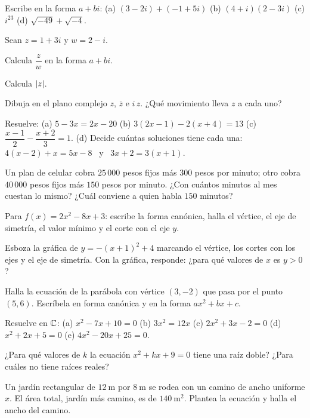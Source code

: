 \documentclass[11pt,a4paper]{article}
\newcommand{\conj}[1]{\overline{#1}}
\begin{document}
\taller
\begin{ejercicios}
\item Escribe en la forma $a+bi$:
  (a) $(3-2i)+(-1+5i)$ \quad (b) $(4+i)(2-3i)$ \quad (c) $i^{23}$ \quad (d) $\sqrt{-49}+\sqrt{-4}$.
\item Sean $z=1+3i$ y $w=2-i$.
  \begin{ejercicios}
  \item Calcula $\dfrac{z}{w}$ en la forma $a+bi$.
  \item Calcula $\left\lvert z\right\rvert$.
  \item Dibuja en el plano complejo $z$, $\conj z$ e $i\,z$. ¿Qué movimiento lleva $z$ a cada uno?
  \end{ejercicios}
\item Resuelve:
  (a) $5-3x=2x-20$ \quad (b) $3(2x-1)-2(x+4)=13$ \quad (c) $\dfrac{x-1}{2}-\dfrac{x+2}{3}=1$.\newline
  (d) Decide cuántas soluciones tiene cada una: $4(x-2)+x=5x-8$ \ y \ $3x+2=3(x+1)$.
\item Un plan de celular cobra $25\,000$ pesos fijos más $300$ pesos por minuto; otro cobra $40\,000$ pesos fijos más
  $150$ pesos por minuto. ¿Con cuántos minutos al mes cuestan lo mismo? ¿Cuál conviene a quien habla $150$ minutos?
\item Para $f(x)=2x^2-8x+3$: escribe la forma canónica, halla el vértice, el eje de simetría, el valor mínimo y el
  corte con el eje $y$.
\item Esboza la gráfica de $y=-(x+1)^2+4$ marcando el vértice, los cortes con los ejes y el eje de simetría. Con la
  gráfica, responde: ¿para qué valores de $x$ es $y>0$?
\item Halla la ecuación de la parábola con vértice $(3,-2)$ que pasa por el punto $(5,6)$. Escríbela en forma canónica
  y en la forma $ax^2+bx+c$.
\item Resuelve en $\mathbb{C}$:
  (a) $x^2-7x+10=0$ \quad (b) $3x^2=12x$ \quad (c) $2x^2+3x-2=0$ \quad (d) $x^2+2x+5=0$ \quad (e) $4x^2-20x+25=0$.
\item ¿Para qué valores de $k$ la ecuación $x^2+kx+9=0$ tiene una raíz doble? ¿Para cuáles no tiene raíces reales?
\item Un jardín rectangular de $\SI{12}{\metre}$ por $\SI{8}{\metre}$ se rodea con un camino de ancho uniforme $x$. El
  área total, jardín más camino, es de $\SI{140}{\metre\squared}$. Plantea la ecuación y halla el ancho del camino.
\end{ejercicios}
\end{document}
